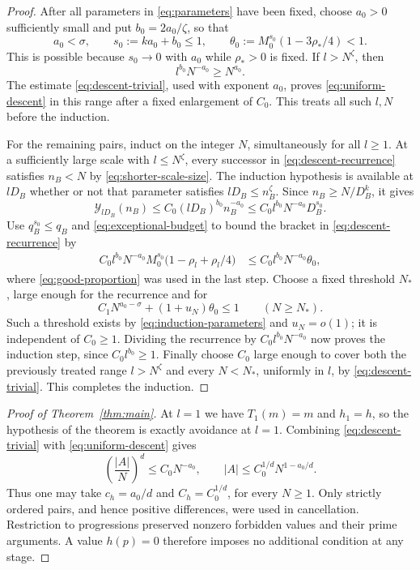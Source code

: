 \begin{proof}
After all parameters in \eqref{eq:parameters} have been fixed, choose
$a_0>0$ sufficiently small and put $b_0=2a_0/\zeta$, so that
\begin{equation}\label{eq:induction-parameters}
 a_0<\sigma,\qquad s_0:=ka_0+b_0\le1,\qquad
 \theta_0:=M_0^{s_0}(1-3\rho_*/4)<1.
\end{equation}
This is possible because $s_0\to0$ with $a_0$ while $\rho_*>0$ is fixed.
If $l>N^\zeta$, then
\[
 l^{b_0}N^{-a_0}\ge N^{a_0}.
\]
The estimate \eqref{eq:descent-trivial}, used with exponent $a_0$, proves
\eqref{eq:uniform-descent} in this range after a fixed enlargement of
$C_0$.  This treats all such $l,N$ before the induction.

For the remaining pairs, induct on the integer $N$, simultaneously for
all $l\ge1$.  At a sufficiently large scale with $l\le N^\zeta$, every
successor in \eqref{eq:descent-recurrence} satisfies $n_B<N$ by
\eqref{eq:shorter-scale-size}.  The induction hypothesis is available at
$lD_B$ whether or not that parameter satisfies $lD_B\le n_B^\zeta$.
Since $n_B\ge N/D_B^k$, it gives
\[
 \mathcal Y_{lD_B}(n_B)
 \le C_0(lD_B)^{b_0}n_B^{-a_0}
 \le C_0l^{b_0}N^{-a_0}D_B^{s_0}.
\]
Use $q_B^{s_0}\le q_B$ and \eqref{eq:exceptional-budget} to bound the
bracket in \eqref{eq:descent-recurrence} by
\[
 \begin{split}
 C_0l^{b_0}N^{-a_0}M_0^{s_0}
   \bigl(1-\rho_l+\rho_l/4\bigr)
 &\le C_0l^{b_0}N^{-a_0}\theta_0,
 \end{split}
\]
where \eqref{eq:good-proportion} was used in the last step.
Choose a fixed threshold $N_*$, large enough for the recurrence and for
\[
 C_1N^{a_0-\sigma}+(1+u_N)\theta_0\le1
 \qquad(N\ge N_*).
\]
Such a threshold exists by \eqref{eq:induction-parameters} and $u_N=o(1)$;
it is independent of $C_0\ge1$.  Dividing the recurrence by
$C_0l^{b_0}N^{-a_0}$ now proves the induction step, since
$C_0l^{b_0}\ge1$.
Finally choose $C_0$ large enough to cover both the previously treated
range $l>N^\zeta$ and every $N<N_*$, uniformly in $l$, by
\eqref{eq:descent-trivial}.  This completes the induction.
\end{proof}

\begin{proof}[Proof of Theorem~\ref{thm:main}]
At $l=1$ we have $T_1(m)=m$ and $h_1=h$, so the hypothesis of the theorem
is exactly avoidance at $l=1$.  Combining \eqref{eq:descent-trivial}
with \eqref{eq:uniform-descent} gives
\[
 \left(\frac{|A|}{N}\right)^d\le C_0N^{-a_0},
 \qquad |A|\le C_0^{1/d}N^{1-a_0/d}.
\]
Thus one may take $c_h=a_0/d$ and $C_h=C_0^{1/d}$, for every $N\ge1$.
Only strictly ordered pairs, and hence positive differences, were used
in cancellation.  Restriction to progressions preserved nonzero
forbidden values and their prime arguments.  A value $h(p)=0$ therefore
imposes no additional condition at any stage.
\end{proof}
